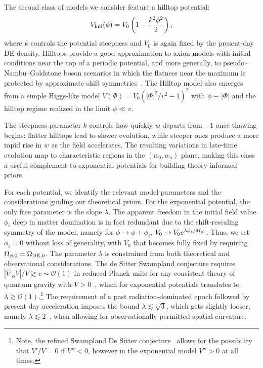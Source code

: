 The second class of models we consider feature a hilltop potential:
\begin{equation}
    V_{\rm hill}(\phi)=V_0\left(1-\frac{k^2\phi^2}{2}\right)\label{eq:ch11-hilltop},
\end{equation}
where $k$ controls the potential steepness and $V_0$ is again fixed by the present-day DE density. Hilltops provide a good approximation to axion models with initial conditions near the top of a periodic potential, and more generally, to pseudo--Nambu--Goldstone boson scenarios in which the flatness near the maximum is protected by approximate shift symmetries~\cite{Dutta:2008qn,Frieman:1995pm}. The Hilltop model also emerges from a simple Higgs-like model $V(\Phi)= V_0 ( |\Phi|^2/v^2 -1)^2$ with $\phi \equiv |\Phi|$ and the hilltop regime realized in the limit $\phi \ll v$.

The steepness parameter $k$ controls how quickly $w$ departs from $-1$ once thawing begins: flatter hilltops lead to slower evolution, while steeper ones produce a more rapid rise in $w$ as the field accelerates.  The resulting variations in late-time evolution map to characteristic regions in the $(w_0,w_a)$ plane, making this class a useful complement to exponential potentials for building theory-informed priors.

For each potential, we identify the relevant model parameters and the considerations guiding our theoretical priors. For the exponential potential, the only free parameter is the slope $\lambda$. The apparent freedom in the initial field value $\phi_i$ deep in matter domination is in fact redundant due to the shift-rescaling symmetry of the model, namely for $\phi\rightarrow \phi+\phi_i$, $V_0\rightarrow V_0e^{\lambda \phi_i/M_{\mathrm{pl}}}$. Thus, we set $\phi_i=0$ without loss of generality, with $V_0$ that becomes fully fixed by requiring $\Omega_{\phi,0}=\Omega_{\rm DE,0}$. The parameter $\lambda$ is constrained from both theoretical and observational considerations. The de Sitter Swampland conjecture requires $|\nabla_\phi V|/V \gtrsim c \sim \mathcal{O}(1)$ in reduced Planck units for any consistent theory of quantum gravity with $V > 0$~\cite{Obied:2018sgi}, which for exponential potentials translates to $\lambda \gtrsim \mathcal{O}(1)$.\footnote{Note, the refined Swampland De Sitter conjecture~\cite{Agrawal:2018rcg} allows for the possibility that $V'/V=0$ if $V''<0$, however in the exponential model $V''>0$ at all times.} The requirement of a past radiation-dominated epoch followed by present-day acceleration imposes the bound $\lambda \lesssim \sqrt{3}$, which gets slightly looser, namely $\lambda \lesssim 2$~\cite{Andriot:2024jsh},  when allowing for observationally permitted spatial curvature.

